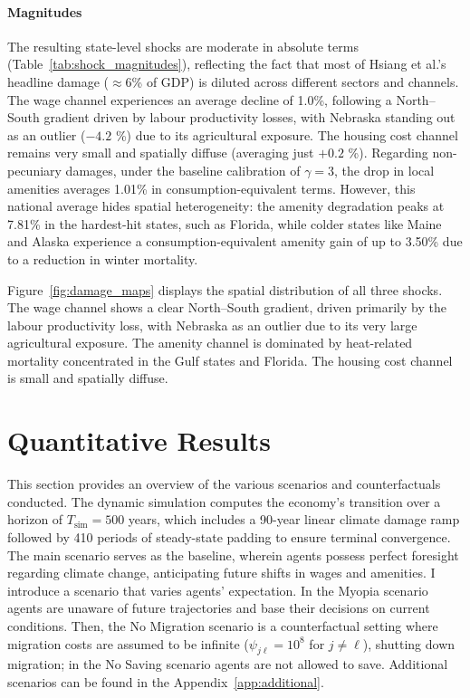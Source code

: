 \documentclass[12pt, a4paper]{article}
\begin{document}
\paragraph{Magnitudes}
The resulting state-level shocks are moderate in absolute terms (Table~\ref{tab:shock_magnitudes}), reflecting the fact that most of Hsiang et al.'s headline damage ($\approx$6\% of GDP) is diluted across different sectors and channels. The wage channel experiences an average decline of 1.0\%, following a North--South gradient driven by labour productivity losses, with Nebraska standing out as an outlier ($-4.2$ \%) due to its agricultural exposure. The housing cost channel remains very small and spatially diffuse (averaging just $+0.2$ \%). Regarding non-pecuniary damages, under the baseline calibration of $\gamma = 3$, the drop in local amenities averages 1.01\% in consumption-equivalent terms. However, this national average hides spatial heterogeneity: the amenity degradation peaks at 7.81\% in the hardest-hit states, such as Florida, while colder states like Maine and Alaska experience a consumption-equivalent amenity gain of up to 3.50\% due to a reduction in winter mortality.

Figure~\ref{fig:damage_maps} displays the spatial distribution of all three shocks. The wage channel shows a clear North--South gradient, driven primarily by the labour productivity loss, with Nebraska as an outlier due to its very large agricultural exposure. The amenity channel is dominated by heat-related mortality concentrated in the Gulf states and Florida. The housing cost channel is small and spatially diffuse.


\section{Quantitative Results}
This section provides an overview of the various scenarios and counterfactuals conducted. The dynamic simulation computes the economy's transition over a horizon of $T_{\text{sim}} = 500$ years, which includes a 90-year linear climate damage ramp followed by 410 periods of steady-state padding to ensure terminal convergence. The main scenario serves as the baseline, wherein agents possess perfect foresight regarding climate change, anticipating future shifts in wages and amenities. I introduce a scenario that varies agents' expectation. In the Myopia scenario agents are unaware of future trajectories and base their decisions on current conditions. Then, the No Migration scenario is a counterfactual setting where migration costs are assumed to be infinite ($\psi_{j\ell} = 10^8$ for $j \neq \ell$), shutting down migration; in the No Saving scenario agents are not allowed to save. Additional scenarios can be found in the Appendix~\ref{app:additional}.
\end{document}
